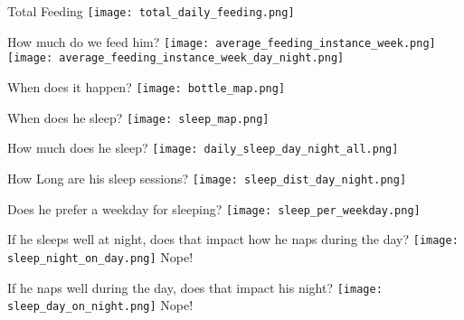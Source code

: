 \begin{frame}{Total Feeding}
\centering
\texttt{[image: total\_daily\_feeding.png]}
\end{frame}

\begin{frame}{How much do we feed him?}
\centering
    \texttt{[image: average\_feeding\_instance\_week.png]}
\hfill                      
    \texttt{[image: average\_feeding\_instance\_week\_day\_night.png]}
\end{frame}

\begin{frame}{When does it happen?}
\centering
\texttt{[image: bottle\_map.png]}
\end{frame}

\begin{frame}{When does he sleep?}
\centering
\texttt{[image: sleep\_map.png]}
\end{frame}

\begin{frame}{How much does he sleep?}
\centering
\texttt{[image: daily\_sleep\_day\_night\_all.png]}
\end{frame}

\begin{frame}{How Long are his sleep sessions?}
\centering
\texttt{[image: sleep\_dist\_day\_night.png]}
\end{frame}

\begin{frame}{Does he prefer a weekday for sleeping?}
\centering
\texttt{[image: sleep\_per\_weekday.png]}
\end{frame}

\begin{frame}{If he sleeps well at night, does that impact how he naps during the day?}
\centering
\texttt{[image: sleep\_night\_on\_day.png]}
    Nope!
\end{frame}

\begin{frame}{If he naps well during the day, does that impact his night?}
\centering
\texttt{[image: sleep\_day\_on\_night.png]}
Nope!
\end{frame}

